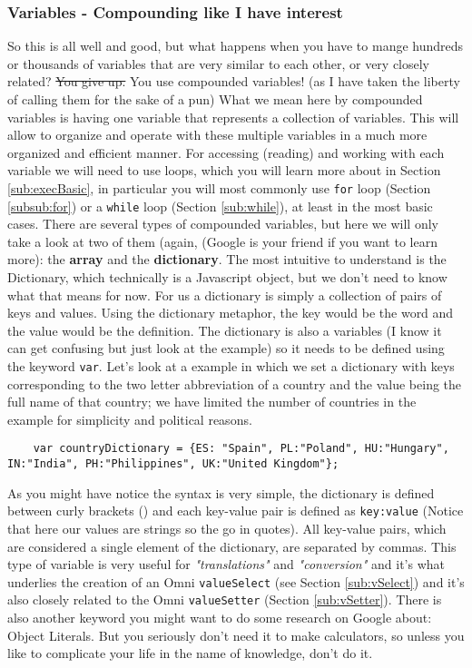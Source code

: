 \subsubsection{Variables - Compounding like I have interest} 
\label{subsub:array}
So this is all well and good, but what happens when you have to mange hundreds or thousands of variables that are very similar to each other, or very closely related? \sout{You give up.} You use compounded variables! (as I have taken the liberty of calling them for the sake of a pun)
What we mean here by compounded variables is having one variable that represents a collection of variables. This will allow to organize and operate with these multiple variables in a much more organized and efficient manner. For accessing (reading) and working with each variable we will need to use loops, which you will learn more about in Section \ref{sub:execBasic}, in particular you will most commonly use \texttt{for} loop (Section \ref{subsub:for}) or a \texttt{while} loop (Section \ref{sub:while}), at least in the most basic cases. 
There are several types of compounded variables, but here we will only take a look at two of them (again, (Google is your friend if you want to learn more): the \textbf{array} and the \textbf{dictionary}.
The most intuitive to understand is the Dictionary, which technically is a Javascript object, but we don't need to know what that means for now. For us a dictionary is simply a collection of pairs of keys and values. Using the dictionary metaphor, the key would be the word and the value would be the definition. The dictionary is also a variables (I know it can get confusing but just look at the example) so it needs to be defined using the keyword \texttt{var}.
Let's look at a example in which we set a dictionary with keys corresponding to the two letter abbreviation of a country and the value being the full name of that country; we have limited the number of countries in the example for simplicity and political reasons.

\begin{lstlisting}
    var countryDictionary = {ES: "Spain", PL:"Poland", HU:"Hungary", IN:"India", PH:"Philippines", UK:"United Kingdom"}; 
\end{lstlisting}
As you might have notice the syntax is very simple, the dictionary is defined between curly brackets ({}) and each key-value pair is defined as \texttt{key:value} (Notice that here our values are strings so the go in quotes). All key-value pairs, which are considered a single element of the dictionary, are separated by commas. 
This type of variable is very useful for \textit{"translations"} and \textit{"conversion"} and it's what underlies the creation of an Omni \texttt{valueSelect} (see Section \ref{sub:vSelect}) and it's also closely related to the Omni \texttt{valueSetter} (Section \ref{sub:vSetter}). There is also another keyword you might want to do some research on Google about: Object Literals. But you seriously don't need it to make calculators, so unless you like to complicate your life in the name of knowledge, don't do it.

